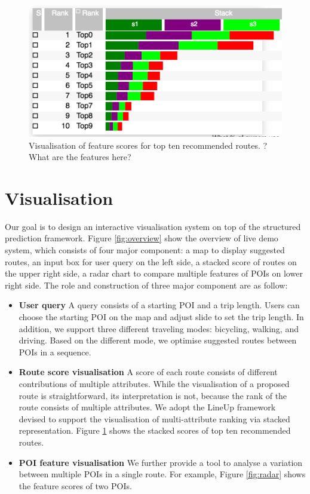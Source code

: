 \documentclass[sigconf]{acmart}
\begin{document}
\begin{figure}[t!]
\includegraphics[width=0.9\linewidth]{figure/sample_stack.png}
\caption{Visualisation of feature scores for top ten recommended routes. ?What are the features here?}
\label{fig:stack}
\end{figure}

\section{Visualisation}
Our goal is to design an interactive visualisation system on top of the structured prediction framework.
Figure \ref{fig:overview} show the overview of live demo system, which consists of four major component: a map to display suggested routes, an input box for user query on the left side, a stacked score of routes on the upper right side, a radar chart to compare multiple features of POIs on lower right side. The role and construction of three major component are as follow:
\begin{itemize}
\item \textbf{User query} A query consists of a starting POI and a trip length. Users can choose the starting POI on the map and adjust slide to set the trip length. In addition, we support three different traveling modes: bicycling, walking, and driving. Based on the different mode, we optimise suggested routes between POIs in a sequence.
\item \textbf{Route score visualisation} A score of each route consists of different contributions of multiple attributes. While the visualisation of a proposed route is straightforward, its interpretation is not, because the rank of the route consists of multiple attributes. We adopt the LineUp framework~\cite{gratzl2013lineup} devised to support the visualisation of multi-attribute ranking via stacked representation. Figure \ref{fig:stack} shows the stacked scores of top ten recommended routes.
\item \textbf{POI feature visualisation} We further provide a tool to analyse a variation between multiple POIs in a single route. For example, Figure \ref{fig:radar} shows the feature scores of two POIs. 
\end{itemize}
\end{document}

